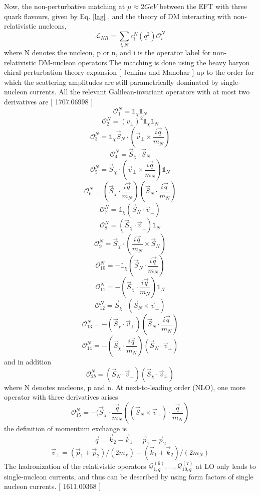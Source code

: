 \documentclass[12pt]{article}
\begin{document}
Now, the non-perturbative matching at $\mu \approx 2 GeV$ between the EFT with three quark flavours, given by Eq. \ref{lag} , and the theory of DM interacting with non-relativistic nucleons, 
\begin{equation}\label{lag2}
\mathcal L_{NR} = \sum_{i,N} c_i^N (q^2) \mathcal O_i^N
\end{equation}
where N denotes the nucleon, p or n, and i is the operator label for non-relativistic DM-nucleon operators
The matching is done using the heavy baryon chiral perturbation theory expansion [ Jenkins and Manohar ] up to the order for which the scattering amplitudes are still parametrically dominated by single-nucleon currents. 
All the relevant Galilean-invariant operators with at most two derivatives are [ 1707.06998 ]
$$
\mathcal O_1^N = \mathbb 1_\chi \mathbb 1_N
$$
$$
\mathcal O_2^N = (v_\bot )^2 \mathbb 1_\chi \mathbb 1_N
$$
$$
\mathcal O_3^N = \mathbb 1_\chi \vec S_N \cdot ( \vec v_\bot \times \frac{i \vec q}{m_N} ) 
$$
$$
\mathcal O_4^N =  \vec S_\chi \cdot  \vec S_N
$$
$$
\mathcal O_5^N = \vec S_\chi \cdot ( \vec v_\bot \times \frac{i \vec q}{m_N} )  \mathbb 1_N
$$
$$
\mathcal O_6^N = (\vec S_\chi \cdot   \frac{i \vec q}{m_N} )(   \vec S_N \cdot   \frac{i \vec q}{m_N} )
$$
$$
\mathcal O_7^N = \mathbb 1_\chi(   \vec S_N \cdot   \vec v_\bot )
$$
$$
\mathcal O_8^N = (   \vec S_\chi \cdot   \vec v_\bot )\mathbb 1_N
$$
$$
\mathcal O_9^N =    \vec S_\chi \cdot  ( \frac{i \vec q}{m_N} \times \vec S_N )
$$
$$
\mathcal O_{10}^N =   - \mathbb 1_\chi  (  \vec S_N  \cdot \frac{i \vec q}{m_N})
$$
$$
\mathcal O_{11}^N =   - (  \vec S_\chi  \cdot \frac{i \vec q}{m_N}) \mathbb 1_N
$$
$$
\mathcal O_{12}^N =  \vec S_\chi  \cdot (  \vec S_N  \times \vec v_\bot)
$$
$$
\mathcal O_{13}^N =   -  (  \vec S_\chi  \cdot \vec v_\bot  )  (  \vec S_N  \cdot \frac{i \vec q}{m_N} )
$$
$$
\mathcal O_{14}^N =   -  (  \vec S_\chi  \cdot \frac{i \vec q}{m_N} )  (  \vec S_N  \cdot \vec v_\bot )
$$
and in addition
$$
\mathcal O_{2b}^N = (\vec S_N \cdot \vec v_\bot ) ( \vec S_\chi \cdot \vec v_\bot)
$$
where N denotes nucleons, p and n. At next-to-leading order (NLO), one more operator with three derivatives arises
$$
\mathcal O_{15}^N = - ( \vec S_\chi \cdot \frac{\vec q } {m_N } ( ( \vec S_N \times \vec v_\bot ) \cdot \frac{\vec q }{m_N} )
$$
the definition of momentum exchange is 
$$
\vec q = \vec k_2 - \vec k_1 = \vec p_1 - \vec p_2
$$
$$
\vec v_\bot = (\vec p_1 + \vec p_2 ) / (2 m_\chi) -  (\vec k_1 + \vec k_2 ) / (2 m_N )  
$$
The hadronization of the relativistic operators $\mathcal Q_{1,q}^{(6) }, ... , \mathcal Q_{10,q}^{(7)}$ at LO only leads to single-nucleon currents, and thus can be described by using form factors of single nucleon currents. [ 1611.00368 ] 
\end{document}
